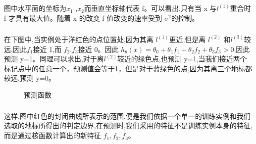 \documentclass{article}
\begin{document}
\begin{CJK}{UTF8}{gbsn}
\subparagraph{}
图中水平面的坐标为$x_1$ ,$x_2$而垂直坐标轴代表 f。可以看出,只有当 x 与$l^{(1)}$重合时 f 才具有最大值。随着 x 的改变 f 值改变的速率受到 $\sigma^2$的控制。
\begin{figure}[H]
\label{fig:734}
\end{figure}
\begin{figure}[H]
\label{fig:735}
\end{figure}
\begin{figure}[H]
\label{fig:736}
\end{figure}
\begin{figure}[H]
\label{fig:737}
\end{figure}
\begin{figure}[H]
\label{fig:738}
\end{figure}
\begin{figure}[H]
\label{fig:739}
\end{figure}
\subparagraph{}
在下图中,当实例处于洋红色的点位置处,因为其离 $l^{(1)}$更近,但是离 $l^{(2)}$ 和$l^{(3)}$较远,因此$f_1$接近 1,而 $f_2$,$f_3$接近 0。因此 $h_\theta(x)=\theta_0+\theta_1f_1+\theta_2f_2+\theta_3f_3>0$,因此预测 y=1。同理可以求出,对于离$l^{(2)}$较近的绿色点,也预测 y=1,当我们接近两个标记点中的任意一个，预测值会等于1，但是对于蓝绿色的点,因为其离三个地标都较远,预测 y=0。
\begin{figure}[H]
\label{fig:740}
\caption{预测函数}
\end{figure}
\subparagraph{}
这样,图中红色的封闭曲线所表示的范围,便是我们依据一个单一的训练实例和我们选取的地标所得出的判定边界,在预测时,我们采用的特征不是训练实例本身的特征,而是通过核函数计算出的新特征 $f_1,f_2,f_3$。

\end{CJK}
\end{document}
